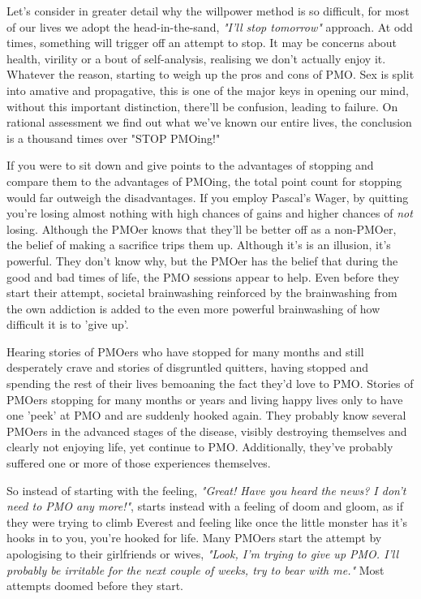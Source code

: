 \documentclass[easypeasy.tex]{subfiles}
\begin{document}
Let's consider in greater detail why the willpower method is so difficult, for most of our lives we adopt the head-in-the-sand, \textit{"I'll stop tomorrow"} approach. At odd times, something will trigger off an attempt to stop. It may be concerns about health, virility or a bout of self-analysis, realising we don't actually enjoy it. Whatever the reason, starting to weigh up the pros and cons of PMO. Sex is split into amative and propagative, this is one of the major keys in opening our mind, without this important distinction, there'll be confusion, leading to failure. On rational assessment we find out what we've known our entire lives, the conclusion is a thousand times over "STOP PMOing!"

If you were to sit down and give points to the advantages of stopping and compare them to the advantages of PMOing, the total point count for stopping would far outweigh the disadvantages. If you employ Pascal's Wager, by quitting you're losing almost nothing with high chances of gains and higher chances of \textit{not} losing. Although the PMOer knows that they'll be better off as a non-PMOer, the belief of making a sacrifice trips them up. Although it's is an illusion, it's powerful. They don't know why, but the PMOer has the belief that during the good and bad times of life, the PMO sessions appear to help. Even before they start their attempt, societal brainwashing reinforced by the brainwashing from the own addiction is added to the even more powerful brainwashing of how difficult it is to 'give up'.

Hearing stories of PMOers who have stopped for many months and still desperately crave and stories of disgruntled quitters, having stopped and spending the rest of their lives bemoaning the fact they'd love to PMO. Stories of PMOers stopping for many months or years and living happy lives only to have one 'peek' at PMO and are suddenly hooked again. They probably know several PMOers in the advanced stages of the disease, visibly destroying themselves and clearly not enjoying life, yet continue to PMO. Additionally, they've probably suffered one or more of those experiences themselves.

So instead of starting with the feeling, \textit{"Great! Have you heard the news? I don't need to PMO any more!"}, starts instead with a feeling of doom and gloom, as if they were trying to climb Everest and feeling like once the little monster has it's hooks in to you, you're hooked for life. Many PMOers start the attempt by apologising to their girlfriends or wives, \textit{"Look, I'm trying to give up PMO. I'll probably be irritable for the next couple of weeks, try to bear with me."} Most attempts doomed before they start.
\end{document}
